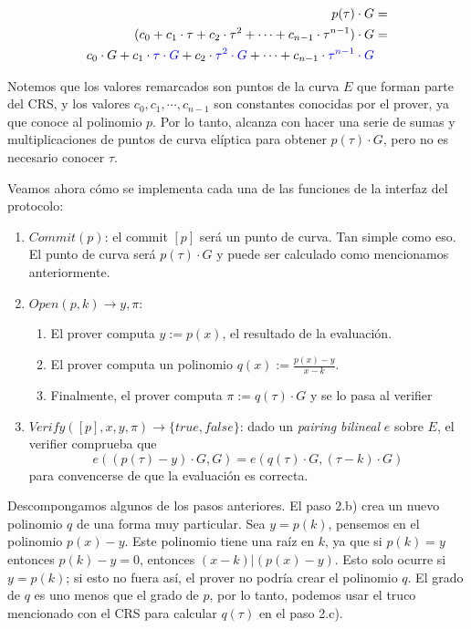 \begin{align*}
p(\tau)\cdot G &= \\
(c_0 + c_1\cdot \tau + c_2 \cdot \tau^2 + \cdots + c_{n-1} \cdot \tau^{n-1})\cdot G &= \\
c_0\cdot G + c_1\cdot \textcolor{blue}{\tau \cdot G} + c_2 \cdot \textcolor{blue}{\tau^2 \cdot G} + \cdots + c_{n-1} \cdot \textcolor{blue}{\tau^{n-1} \cdot G} \\
\end{align*}

Notemos que los valores remarcados son puntos de la curva $E$ que forman parte del CRS, y los valores $c_0, c_1, \cdots, c_{n-1}$ son constantes conocidas por el prover, ya que conoce al polinomio $p$. Por lo tanto, alcanza con hacer una serie de sumas y multiplicaciones de puntos de curva elíptica para obtener $p(\tau)\cdot G$, pero no es necesario conocer $\tau$.

Veamos ahora cómo se implementa cada una de las funciones de la interfaz del protocolo:
\begin{enumerate}
    \item $Commit(p)$: el commit $[p]$ será un punto de curva. Tan simple como eso. El punto de curva será $p(\tau)\cdot G$ y puede ser calculado como mencionamos anteriormente. 
    \item $Open(p,k) \rightarrow y,\pi$: 
    \begin{enumerate}
        \item El prover computa $y := p(x)$, el resultado de la evaluación.
        \item El prover computa un polinomio $q(x) := \frac{p(x)-y}{x-k}$.
        \item Finalmente, el prover computa $\pi := q(\tau)\cdot G$ y se lo pasa al verifier
    \end{enumerate}
    \item $Verify([p],x,y,\pi) \rightarrow \{true,false\}$: dado un \textit{pairing bilineal} $e$ sobre $E$, el verifier comprueba que 
    $$e((p(\tau)-y)\cdot G, G) = e(q(\tau)\cdot G, (\tau - k)\cdot G)$$ para convencerse de que la evaluación es correcta.
\end{enumerate}

Descompongamos algunos de los pasos anteriores. El paso 2.b) crea un nuevo polinomio $q$ de una forma muy particular. Sea $y = p(k)$, pensemos en el polinomio $p(x) - y$. Este polinomio tiene una raíz en $k$, ya que si $p(k) = y$ entonces $p(k) - y = 0$, entonces $(x-k) | (p(x) - y)$. Esto solo ocurre si $y = p(k)$; si esto no fuera así, el prover no podría crear el polinomio $q$. El grado de $q$ es uno menos que el grado de $p$, por lo tanto, podemos usar el truco mencionado con el CRS para calcular $q(\tau)$ en el paso 2.c).

